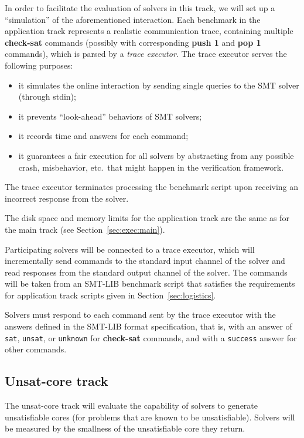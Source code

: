 \documentclass[12pt]{article}
\newcommand{\akey}[1]{\textbf{#1}}
\begin{document}
In order to facilitate the evaluation of solvers in this track, we
will set up a ``simulation'' of the aforementioned interaction.  Each
benchmark in the application track represents a realistic
communication trace, containing multiple \akey{check-sat} commands
(possibly with corresponding \akey{push 1} and \akey{pop 1} commands),
which is parsed by a \emph{trace executor}. The trace executor serves
the following purposes:
\begin{itemize}
\item it simulates the online interaction by sending single queries to
  the SMT solver (through stdin);
\item it prevents ``look-ahead'' behaviors of SMT solvers;
\item it records time and answers for each command;
\item it guarantees a fair execution for all solvers by abstracting
  from any possible crash, misbehavior, etc.\ that might happen in the
  verification framework.
\end{itemize}
%
The trace executor terminates processing the benchmark script upon
receiving an incorrect response from the solver.

The disk space and memory limits for the application track are the
same as for the main track (see Section~\ref{sec:exec:main}).

%
Participating solvers will be connected to a trace executor, which
will incrementally send commands to the standard input channel of the
solver and read responses from the standard output channel of the
solver.  The commands will be taken from an SMT-LIB benchmark script
that satisfies the requirements for application track scripts given in
Section~\ref{sec:logistics}.

Solvers must respond to each command sent by the trace executor with
the answers defined in the SMT-LIB format specification, that is, with
an answer of \texttt{sat}, \texttt{unsat}, or \texttt{unknown} for
\akey{check-sat} commands, and with a \texttt{success} answer for
other commands.

\subsection{Unsat-core track}
\label{sec:exec:unsat-core}

The unsat-core track will evaluate the capability of solvers to
generate unsatisfiable cores (for problems that are known to be
unsatisfiable).  Solvers will be measured by the smallness of the
unsatisfiable core they return.
\end{document}

